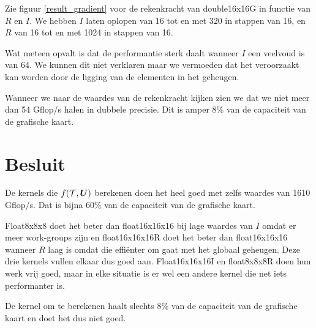 Zie figuur \ref{result_gradient} voor de rekenkracht van double16x16G in functie van $R$ en $I$. We hebben $I$ laten oplopen van 16 tot en met 320 in stappen van 16, en $R$ van 16 tot en met 1024 in stappen van 16.

Wat meteen opvalt is dat de performantie sterk daalt wanneer $I$ een veelvoud is van 64. We kunnen dit niet verklaren maar we vermoeden dat het veroorzaakt kan worden door de ligging van de elementen in het geheugen.

Wanneer we naar de waardes van de rekenkracht kijken zien we dat we niet meer dan 54 Gflop/s halen in dubbele precisie. Dit is amper 8\% van de capaciteit van de grafische kaart.

\section{Besluit}

De kernels die $f(\mathcal{T}, \boldsymbol{U})$ berekenen doen het heel goed met zelfs waardes van 1610 Gflop/s. Dat is bijna 60\% van de capaciteit van de grafische kaart. 

Float8x8x8 doet het beter dan float16x16x16 bij lage waardes van $I$ omdat er meer work-groups zijn en float16x16x16R doet het beter dan float16x16x16 wanneer $R$ laag is omdat die effi\"enter om gaat met het globaal geheugen. Deze drie kernels vullen elkaar dus goed aan. Float16x16x16I en float8x8x8R doen hun werk vrij goed, maar in elke situatie is er wel een andere kernel die net iets performanter is.

De kernel om \GGG{} te berekenen haalt slechts 8\% van de capaciteit van de grafische kaart en doet het dus niet goed.